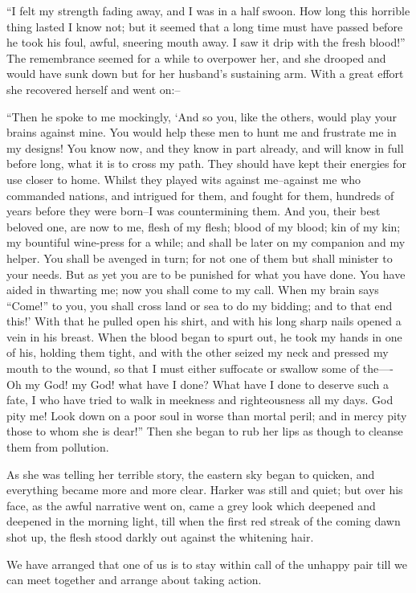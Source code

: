 \documentclass[12pt,openright]{book}
\begin{document}
“I felt my strength fading away, and I was in a half swoon. How long this horrible thing lasted I know not; but it seemed that a long time must have passed before he took his foul, awful, sneering mouth away. I saw it drip with the fresh blood!” The remembrance seemed for a while to overpower her, and she drooped and would have sunk down but for her husband’s sustaining arm. With a great effort she recovered herself and went on:–

“Then he spoke to me mockingly, ‘And so you, like the others, would play your brains against mine. You would help these men to hunt me and frustrate me in my designs! You know now, and they know in part already, and will know in full before long, what it is to cross my path. They should have kept their energies for use closer to home. Whilst they played wits against me–against me who commanded nations, and intrigued for them, and fought for them, hundreds of years before they were born–I was countermining them. And you, their best beloved one, are now to me, flesh of my flesh; blood of my blood; kin of my kin; my bountiful wine-press for a while; and shall be later on my companion and my helper. You shall be avenged in turn; for not one of them but shall minister to your needs. But as yet you are to be punished for what you have done. You have aided in thwarting me; now you shall come to my call. When my brain says “Come!” to you, you shall cross land or sea to do my bidding; and to that end this!’ With that he pulled open his shirt, and with his long sharp nails opened a vein in his breast. When the blood began to spurt out, he took my hands in one of his, holding them tight, and with the other seized my neck and pressed my mouth to the wound, so that I must either suffocate or swallow some of the—- Oh my God! my God! what have I done? What have I done to deserve such a fate, I who have tried to walk in meekness and righteousness all my days. God pity me! Look down on a poor soul in worse than mortal peril; and in mercy pity those to whom she is dear!” Then she began to rub her lips as though to cleanse them from pollution.

As she was telling her terrible story, the eastern sky began to quicken, and everything became more and more clear. Harker was still and quiet; but over his face, as the awful narrative went on, came a grey look which deepened and deepened in the morning light, till when the first red streak of the coming dawn shot up, the flesh stood darkly out against the whitening hair.

We have arranged that one of us is to stay within call of the unhappy pair till we can meet together and arrange about taking action.
\end{document}

